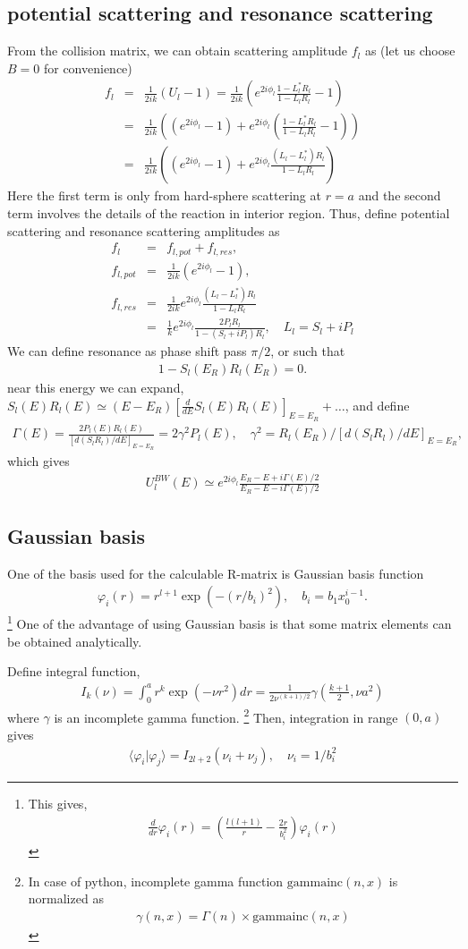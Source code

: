 \documentclass[11pt]{book}
\def\la{\langle}
\def\ra{\rangle}
\newcommand{\bea}{\begin{eqnarray}}
\newcommand{\eea}{\end{eqnarray}}
\newcommand{\no}{\nonumber \\}
\begin{document}
\subsection{potential scattering and resonance scattering}
From the collision matrix, we can obtain scattering amplitude $f_l$ as
(let us choose $B=0$ for convenience)
\bea 
f_l&=&\frac{1}{2ik}(U_l -1) 
  = \frac{1}{2ik}\left(e^{2i\phi_l}\frac{1-L_l^* R_l}{1-L_l R_l}-1    \right) \no 
 &=&  \frac{1}{2ik}\left((e^{2i\phi_l} -1)+e^{2i\phi_l} (\frac{1-L_l^* R_l}{1-L_l R_l}-1)\right)
   \no 
 &=&  \frac{1}{2ik}\left((e^{2i\phi_l} -1)+e^{2i\phi_l}\frac{(L_l-L_l^*)R_l}{1-L_l R_l} \right)  
\eea 
Here the first term is only from hard-sphere scattering at $r=a$ and the second term 
involves the details of the reaction in interior region. 
Thus, define potential scattering and resonance scattering amplitudes as 
\bea 
f_l &=& f_{l,pot}+f_{l,res},\no 
f_{l,pot}&=& \frac{1}{2ik}(e^{2i\phi_l} -1),\no 
f_{l,res}&=& \frac{1}{2ik}e^{2i\phi_l}\frac{(L_l-L_l^*)R_l}{1-L_l R_l} \no 
         &=& \frac{1}{k}e^{2i\phi_l}\frac{2 P_l R_l}{1-(S_l+i P_l) R_l},\quad L_l = S_l+i P_l   
\eea 
We can define resonance as phase shift pass $\pi/2$, or such that 
\bea 
1- S_l(E_R) R_l(E_R) =0. 
\eea 
near this energy we can expand, $S_l(E)R_l(E)\simeq (E-E_R)\left[\frac{d}{dE} S_l(E)R_l(E)\right]_{E=E_R}+\dots $, and define
\bea 
\Gamma(E)=\frac{2 P_l(E) R_l(E)}{[d(S_l R_l)/dE]_{E=E_R} } =2\gamma^2 P_l(E),
\quad \gamma^2= R_l(E_R)/[d(S_l R_l)/dE]_{E=E_R} ,
\eea 
which gives 
\bea 
U_l^{BW}(E)\simeq e^{2i\phi_l}\frac{E_R-E+i\Gamma(E)/2}{E_R-E-i\Gamma(E)/2}
\eea 

\subsection{Gaussian basis}
One of the basis used for the calculable R-matrix is Gaussian basis function
\bea 
\varphi_i(r)=r^{l+1}\exp(-(r/b_i)^2), \quad b_i=b_1 x_0^{i-1}.
\eea 
\footnote{ 
This gives,
\bea 
\frac{d}{dr}\varphi_i(r)=\left( \frac{l(l+1)}{r}-\frac{2r}{b_i^2}\right)\varphi_i(r)
\eea 
}
One of the advantage of using Gaussian basis is that some matrix elements can be obtained analytically. 

Define integral function,
\bea 
I_k(\nu)=\int_0^a r^k \exp(-\nu r^2) dr=\frac{1}{2\nu^{ (k+1)/2 }} \gamma( \frac{k+1}{2},\nu a^2  )
\eea 
where $\gamma$ is an incomplete gamma function.
\footnote{In case of python, incomplete gamma function $\mbox{gammainc}(n,x)$ is normalized as 
	\bea
	 \gamma( n,x  )=\Gamma(n) \times \mbox{gammainc}(n,x)
	\eea 
} 
Then, integration in range $(0,a)$ gives 
\bea 
\la \varphi_i|\varphi_j\ra = I_{2l+2}(\nu_i+\nu_j),\quad \nu_i=1/b_i^2
\eea 
\end{document}
